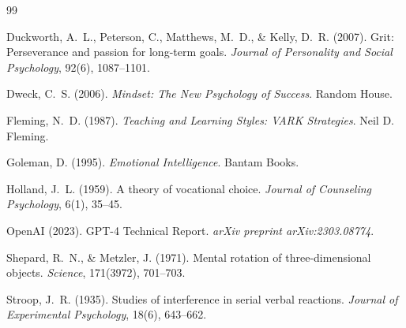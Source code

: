 \documentclass[11pt,a4paper]{article}
\begin{document}

\begin{thebibliography}{99}

Duckworth, A.~L., Peterson, C., Matthews, M.~D., \& Kelly, D.~R. (2007).
\newblock Grit: Perseverance and passion for long-term goals.
\newblock \emph{Journal of Personality and Social Psychology}, 92(6), 1087--1101.

Dweck, C.~S. (2006).
\newblock \emph{Mindset: The New Psychology of Success}.
\newblock Random House.

Fleming, N.~D. (1987).
\newblock \emph{Teaching and Learning Styles: VARK Strategies}.
\newblock Neil D. Fleming.

Goleman, D. (1995).
\newblock \emph{Emotional Intelligence}.
\newblock Bantam Books.

Holland, J.~L. (1959).
\newblock A theory of vocational choice.
\newblock \emph{Journal of Counseling Psychology}, 6(1), 35--45.

OpenAI (2023).
\newblock GPT-4 Technical Report.
\newblock \emph{arXiv preprint arXiv:2303.08774}.

Shepard, R.~N., \& Metzler, J. (1971).
\newblock Mental rotation of three-dimensional objects.
\newblock \emph{Science}, 171(3972), 701--703.

Stroop, J.~R. (1935).
\newblock Studies of interference in serial verbal reactions.
\newblock \emph{Journal of Experimental Psychology}, 18(6), 643--662.

\end{thebibliography}
\end{document}
